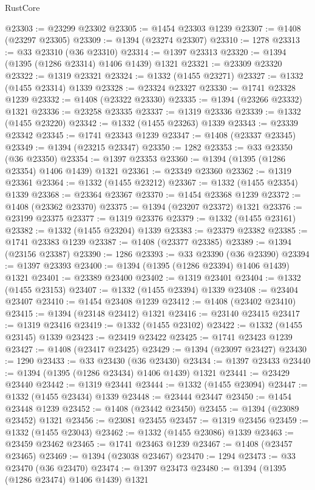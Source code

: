 \begin{lexlean}{RustCore}
\begin{coremodule}
@23303 := @23299 @23302
@23305 := @1454 @23303 @1239
@23307 := @1408 (@23297 @23305)
@23309 := @1394 (@23274 @23307)
@23310 := 1278
@23313 := @33 @23310 (@36 @23310)
@23314 := @1397 @23313
@23320 := @1394 (@1395 (@1286 @23314) @1406 @1439) @1321
@23321 := @23309 @23320
@23322 := @1319 @23321
@23324 := @1332 (@1455 @23271)
@23327 := @1332 (@1455 @23314) @1339
@23328 := @23324 @23327
@23330 := @1741 @23328 @1239
@23332 := @1408 (@23322 @23330)
@23335 := @1394 (@23266 @23332) @1321
@23336 := @23258 @23335
@23337 := @1319 @23336
@23339 := @1332 (@1455 @23220)
@23342 := @1332 (@1455 @23263) @1339
@23343 := @23339 @23342
@23345 := @1741 @23343 @1239
@23347 := @1408 (@23337 @23345)
@23349 := @1394 (@23215 @23347)
@23350 := 1282
@23353 := @33 @23350 (@36 @23350)
@23354 := @1397 @23353
@23360 := @1394 (@1395 (@1286 @23354) @1406 @1439) @1321
@23361 := @23349 @23360
@23362 := @1319 @23361
@23364 := @1332 (@1455 @23212)
@23367 := @1332 (@1455 @23354) @1339
@23368 := @23364 @23367
@23370 := @1454 @23368 @1239
@23372 := @1408 (@23362 @23370)
@23375 := @1394 (@23207 @23372) @1321
@23376 := @23199 @23375
@23377 := @1319 @23376
@23379 := @1332 (@1455 @23161)
@23382 := @1332 (@1455 @23204) @1339
@23383 := @23379 @23382
@23385 := @1741 @23383 @1239
@23387 := @1408 (@23377 @23385)
@23389 := @1394 (@23156 @23387)
@23390 := 1286
@23393 := @33 @23390 (@36 @23390)
@23394 := @1397 @23393
@23400 := @1394 (@1395 (@1286 @23394) @1406 @1439) @1321
@23401 := @23389 @23400
@23402 := @1319 @23401
@23404 := @1332 (@1455 @23153)
@23407 := @1332 (@1455 @23394) @1339
@23408 := @23404 @23407
@23410 := @1454 @23408 @1239
@23412 := @1408 (@23402 @23410)
@23415 := @1394 (@23148 @23412) @1321
@23416 := @23140 @23415
@23417 := @1319 @23416
@23419 := @1332 (@1455 @23102)
@23422 := @1332 (@1455 @23145) @1339
@23423 := @23419 @23422
@23425 := @1741 @23423 @1239
@23427 := @1408 (@23417 @23425)
@23429 := @1394 (@23097 @23427)
@23430 := 1290
@23433 := @33 @23430 (@36 @23430)
@23434 := @1397 @23433
@23440 := @1394 (@1395 (@1286 @23434) @1406 @1439) @1321
@23441 := @23429 @23440
@23442 := @1319 @23441
@23444 := @1332 (@1455 @23094)
@23447 := @1332 (@1455 @23434) @1339
@23448 := @23444 @23447
@23450 := @1454 @23448 @1239
@23452 := @1408 (@23442 @23450)
@23455 := @1394 (@23089 @23452) @1321
@23456 := @23081 @23455
@23457 := @1319 @23456
@23459 := @1332 (@1455 @23043)
@23462 := @1332 (@1455 @23086) @1339
@23463 := @23459 @23462
@23465 := @1741 @23463 @1239
@23467 := @1408 (@23457 @23465)
@23469 := @1394 (@23038 @23467)
@23470 := 1294
@23473 := @33 @23470 (@36 @23470)
@23474 := @1397 @23473
@23480 := @1394 (@1395 (@1286 @23474) @1406 @1439) @1321

\end{coremodule}
\end{lexlean}
